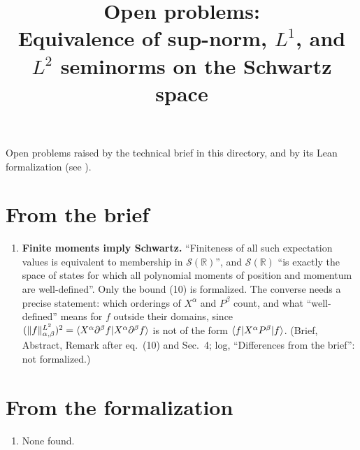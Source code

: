 \documentclass[11pt]{article}
\title{Open problems:\\ Equivalence of sup-norm, $L^1$, and $L^2$ seminorms on the Schwartz
  space}
\author{}
\date{}
\begin{document}
\maketitle

\noindent
Open problems raised by the technical brief in this directory, and by its Lean formalization
(see ).

\section*{From the brief}
\begin{enumerate}
\item \textbf{Finite moments imply Schwartz.} ``Finiteness of all such expectation values is
  equivalent to membership in $\mathcal{S}(\mathbb{R})$'', and $\mathcal{S}(\mathbb{R})$ ``is
  exactly the space of states for which all polynomial moments of position and momentum are
  well-defined''. Only the bound (10) is formalized. The converse needs a precise statement:
  which orderings of $X^\alpha$ and $P^\beta$ count, and what ``well-defined'' means for $f$
  outside their domains, since $(\|f\|^{L^2}_{\alpha,\beta})^2 =
  \braket{X^\alpha\partial^\beta f|X^\alpha\partial^\beta f}$ is not of the form
  $\braket{f|X^\alpha P^\beta|f}$. (Brief, Abstract, Remark after eq.~(10) and Sec.~4; log,
  ``Differences from the brief'': not formalized.)
\end{enumerate}

\section*{From the formalization}
\begin{enumerate}
\item None found.
\end{enumerate}
\end{document}
